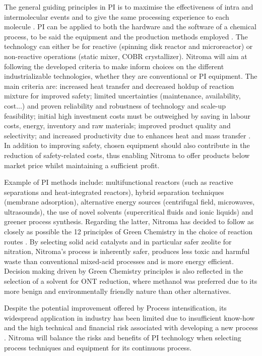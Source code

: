 The general guiding principles in PI is to maximise the effectiveness of intra and intermolecular events and to give the same processing experience to each molecule \cite{randall_process_2020}. PI can be applied to both the hardware and the software of a chemical process, to be said the equipment and the production methods employed \cite{stankiewicz_re-engineering_2003}. The technology can either be for reactive (spinning disk reactor and microreactor) or non-reactive operations (static mixer, COBR crystallizer). Nitroma will aim at following the developed criteria to make inform choices on the different industrializable technologies, whether they are conventional or PI equipment. The main criteria are: increased heat transfer and decreased holdup of reaction mixture for improved safety; limited uncertainties (maintenance, availability, cost...) and proven reliability and robustness of technology and scale-up feasibility; initial high investment costs must be outweighed by saving in labour costs, energy, inventory and raw materials; improved product quality and selectivity; and increased productivity due to enhances heat and mass transfer \cite{randall_process_2020}. In addition to improving safety, chosen equipment should also contribute in the reduction of safety-related costs, thus enabling Nitroma to offer products below market price whilst maintaining a sufficient profit.

Example of PI methods include: multifunctional reactors (such as reactive separations and heat-integrated reactors), hybrid separation techniques (membrane adsorption), alternative energy sources (centrifugal field, microwaves, ultrasounds), the use of novel solvents (supercritical fluids and ionic liquids) and greener process synthesis. Regarding the latter, Nitroma has decided to follow as closely as possible the 12 principles of Green Chemistry in the choice of reaction routes \cite{anastas_green_2010}. By selecting solid acid catalysts and in particular safer zeolite for nitration, Nitroma's process is inherently safer, produces less toxic and harmful waste than conventional mixed-acid processes and is more energy efficient. Decision making driven by Green Chemistry principles is also reflected in the selection of a solvent for ONT reduction, where methanol was preferred due to its more benign and environmentally friendly nature than other alternatives.

Despite the potential improvement offered by Process intensification, its widespread application in industry has been limited due to insufficient know-how and the high technical and financial risk associated with developing a new process \cite{randall_process_2020}. Nitroma will balance the risks and benefits of PI technology when selecting process techniques and equipment for its continuous process.


